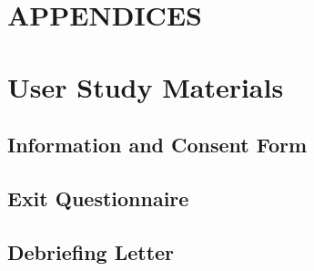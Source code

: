 \documentclass[letterpaper,12pt,titlepage,oneside,final]{book} %
\let\origdoublepage\cleardoublepage
\newcommand{\clearemptydoublepage}{%
	\clearpage{\pagestyle{empty}\origdoublepage}}
\let\cleardoublepage\clearemptydoublepage
\begin{document}
	
	 

	\newpage\cleardoublepage
	\newpage\cleardoublepage
	\newpage\cleardoublepage
	\newpage\cleardoublepage
	\newpage\cleardoublepage
	\newpage\cleardoublepage

	\appendix
	\chapter*{APPENDICES}
	
	\chapter[User Study Materials]{User Study Materials}\label{Append:User Study Materials}
	\section{Information and Consent Form}\label{Append:User Study Materials info-form}
	
	\section{Exit Questionnaire}\label{Append:User Study Materials exit-survey}
	
	\section{Debriefing Letter}\label{Append:User Study Materials debriefing}
	

	
	
\end{document}
